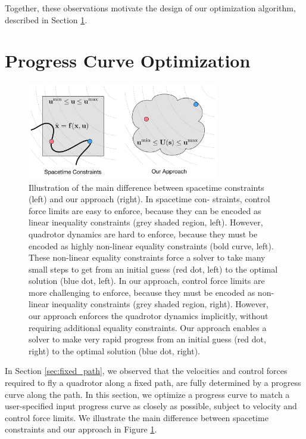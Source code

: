 Together, these observations motivate the design of our optimization algorithm, described in Section \ref{sec:optimization}.



\section{Progress Curve Optimization}
\label{sec:optimization}

\begin{figure}[t]
\centering
\includegraphics[width=3.3in]{images/2016_siggraph/22_optimization_problem_diagram.pdf}
\caption{
Illustration of the main difference between spacetime constraints (left) and our approach (right).
In spacetime con- straints, control force limits are easy to enforce, because they can be encoded as linear inequality constraints (grey shaded region, left).
However, quadrotor dynamics are hard to enforce, because they must be encoded as highly non-linear equality constraints (bold curve, left).
These non-linear equality constraints force a solver to take many small steps to get from an initial guess (red dot, left) to the optimal solution (blue dot, left).
In our approach, control force limits are more challenging to enforce, because they must be encoded as non-linear inequality constraints (grey shaded region, right).
However, our approach enforces the quadrotor dynamics implicitly, without requiring additional equality constraints.
Our approach enables a solver to make very rapid progress from an initial guess (red dot, right) to the optimal solution (blue dot, right).
}
\label{fig:optimization_problem_diagram}
\end{figure}

In Section \ref{sec:fixed_path}, we observed that the velocities and control forces required to fly a quadrotor along a fixed path, are fully determined by a progress curve along the path.
In this section, we optimize a progress curve to match a user-specified input progress curve as closely as possible, subject to velocity and control force limits.
We illustrate the main difference between spacetime constraints and our approach in Figure \ref{fig:optimization_problem_diagram}.

